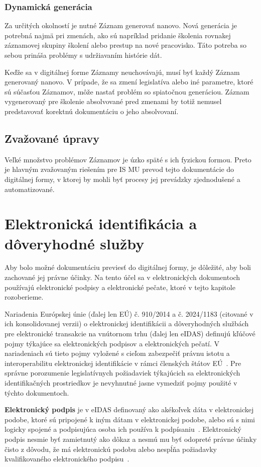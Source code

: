 \documentclass[
  digital,     %
  oneside,     %
  nosansbold,  %
  nocolorbold, %
  lof,         %
  nolot,         %
]{fithesis4}
\begin{document}
\subsection*{Dynamická generácia}
Za určitých okolností je nutné Záznam generovať nanovo. Nová generácia je potrebná najmä pri zmenách, ako sú napríklad pridanie školenia rovnakej záznamovej skupiny školení alebo prestup na nové pracovisko. Táto potreba so sebou prináša problémy s udržiavaním histórie dát.

Keďže sa v digitálnej forme Záznamy neuchovávajú, musí byť každý Záznam generovaný nanovo. V prípade, že sa zmení legislatíva alebo iné parametre, ktoré sú súčasťou Záznamov, môže nastať problém so spiatočnou generáciou. Záznam vygenerovaný pre školenie absolvované pred zmenami by totiž nemusel predstavovať korektnú dokumentáciu o jeho absolvovaní.

\section{Zvažované úpravy}
Veľké množstvo problémov Záznamov je úzko späté s ich fyzickou formou. Preto je hlavným zvažovaným riešením pre IS MU prevod tejto dokumentácie do digitálnej formy, v ktorej by mohli byť procesy jej prevádzky zjednodušené a automatizované.


\chapter{Elektronická identifikácia a dôveryhodné služby}
\label{kap-4}
Aby bolo možné dokumentáciu previesť do digitálnej formy, je dôležité, aby boli zachované jej právne účinky. Na tento účel sa v elektronických dokumentoch používajú elektronické podpisy a elektronické pečate, ktoré v tejto kapitole rozoberieme.

Nariadenia Európskej únie (ďalej len EÚ) č. 910/2014 a č. 2024/1183 (citované v ich konsolidovanej verzii) o elektronickej identifikácii a dôveryhodných službách pre elektronické transakcie na vnútornom trhu (ďalej len eIDAS) definujú kľúčové pojmy týkajúce sa elektronických podpisov a elektronických pečatí. V nariadeniach sú tieto pojmy vyložené s cieľom zabezpečiť právnu istotu a interoperabilitu elektronickej identifikácie v rámci členských štátov EÚ~\cite{eidas2024}. Pre správne porozumenie legislatívnych požiadaviek týkajúcich sa elektronických identifikačných prostriedkov je nevyhnutné jasne vymedziť pojmy použité v týchto dokumentoch.

\textbf{Elektronický podpis} je v eIDAS definovaný ako akékoľvek dáta v elektronickej podobe, ktoré sú pripojené k iným dátam v elektronickej podobe, alebo sú s nimi logicky spojené a podpisujúca osoba ich používa k podpísaniu~\cite[čl.~3,~odst.~10]{eidas2024}. Elektronický podpis nesmie byť zamietnutý ako dôkaz a nesmú mu byť odopreté právne účinky čisto z dôvodu, že má elektronickú podobu alebo nespĺňa požiadavky kvalifikovaného elektronického podpisu~\cite[čl.~25,~odst.~1]{eidas2024}.
\end{document}
